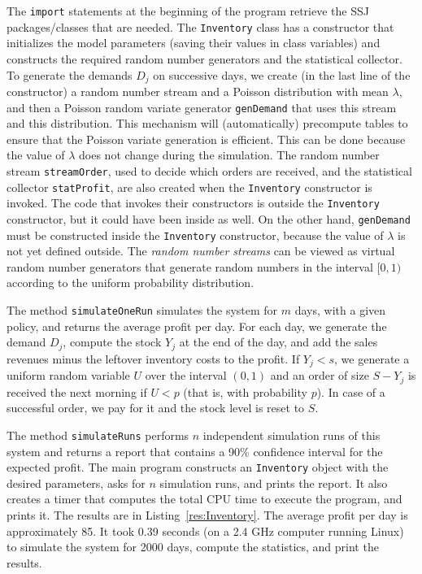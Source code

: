 The \texttt{import} statements at the beginning of the program
retrieve the SSJ packages/classes that are needed.
The \texttt{Inventory} class has a constructor that initializes the
model parameters (saving their values in class variables) and constructs
the required random number generators and the statistical collector.
To generate the demands $D_j$ on successive days, we create
(in the last line of the constructor) a random number stream and
a Poisson distribution with mean $\lambda$, and then a Poisson random
variate generator \texttt{genDemand} that uses this stream and this
distribution.  This mechanism will (automatically) precompute tables
to ensure that the Poisson variate generation is efficient.
This can be done because the value of $\lambda$ does not change during
the simulation.
The random number stream \texttt{streamOrder}, used to decide which
orders are received, and the statistical collector \texttt{statProfit},
are also created when the \texttt{Inventory} constructor is invoked.
The code that invokes their constructors is outside the
\texttt{Inventory} constructor, but it could have been inside as well.
On the other hand, \texttt{genDemand} must be constructed inside
the \texttt{Inventory} constructor, because the value of $\lambda$
is not yet defined outside.
The \emph{random number streams} can be viewed as virtual random number
generators that generate random numbers in the interval $[0,1)$
according to the uniform probability distribution.

The method \texttt{simulateOneRun} simulates the system for $m$ days,
with a given policy, and returns the average profit per day.
For each day, we generate the demand $D_j$, compute the stock $Y_j$
at the end of the day, and add the sales revenues minus the leftover
inventory costs to the profit.  If $Y_j < s$, we generate a uniform
random variable $U$ over the interval $(0,1)$ and an order of size
$S - Y_j$ is received the next morning if $U < p$ (that is, with
probability $p$).  In case of a successful order, we pay for it and
the stock level is reset to $S$.

The method \texttt{simulateRuns} performs $n$ independent
simulation runs of this system and returns a report that contains
a 90\%{} confidence interval for the expected profit.
The main program constructs an \texttt{Inventory} object with the
desired parameters, asks for $n$ simulation runs, and prints the report.
It also creates a timer that computes the total CPU time to execute
the program, and prints it.
The results are in Listing~\ref{res:Inventory}.
The average profit per day is approximately 85.
It took 0.39 seconds (on a 2.4 GHz computer running Linux)
to simulate the system for 2000 days,
compute the statistics, and print the results.

